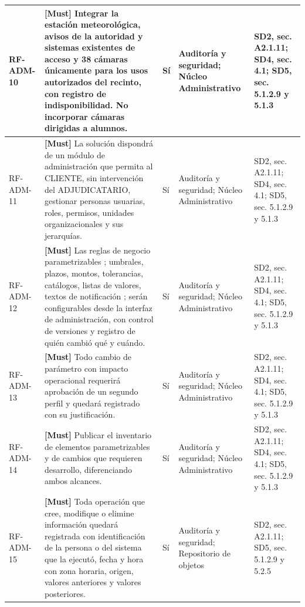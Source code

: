 \begin{paginaHorizontalSynaptix}
\begin{longtable}{|L{0.09\AnchoMatrizTDoce}|L{0.385\AnchoMatrizTDoce}|L{0.065\AnchoMatrizTDoce}|L{0.18\AnchoMatrizTDoce}|L{0.28\AnchoMatrizTDoce}|}
RF-\allowbreak{}ADM-\allowbreak{}10 &
\textbf{[Must]} Integrar la estación meteorológica, avisos de la autoridad y sistemas existentes de acceso y 38 cámaras únicamente para los usos autorizados del recinto, con registro de indisponibilidad. No incorporar cámaras dirigidas a alumnos. &
Sí &
Auditoría y seguridad; Núcleo Administrativo &
SD2, sec. A2.1.11; SD4, sec. 4.1; SD5, sec. 5.1.2.9 y 5.1.3 \\ \hline

RF-\allowbreak{}ADM-\allowbreak{}11 &
\textbf{[Must]} La solución dispondrá de un módulo de administración que permita al CLIENTE, sin intervención del ADJUDICATARIO, gestionar personas usuarias, roles, permisos, unidades organizacionales y sus jerarquías. &
Sí &
Auditoría y seguridad; Núcleo Administrativo &
SD2, sec. A2.1.11; SD4, sec. 4.1; SD5, sec. 5.1.2.9 y 5.1.3 \\ \hline

RF-\allowbreak{}ADM-\allowbreak{}12 &
\textbf{[Must]} Las reglas de negocio parametrizables ; umbrales, plazos, montos, tolerancias, catálogos, listas de valores, textos de notificación ;  serán configurables desde la interfaz de administración, con control de versiones y registro de quién cambió qué y cuándo. &
Sí &
Auditoría y seguridad; Núcleo Administrativo &
SD2, sec. A2.1.11; SD4, sec. 4.1; SD5, sec. 5.1.2.9 y 5.1.3 \\ \hline

RF-\allowbreak{}ADM-\allowbreak{}13 &
\textbf{[Must]} Todo cambio de parámetro con impacto operacional requerirá aprobación de un segundo perfil y quedará registrado con su justificación. &
Sí &
Auditoría y seguridad; Núcleo Administrativo &
SD2, sec. A2.1.11; SD4, sec. 4.1; SD5, sec. 5.1.2.9 y 5.1.3 \\ \hline

RF-\allowbreak{}ADM-\allowbreak{}14 &
\textbf{[Must]} Publicar el inventario de elementos parametrizables y de cambios que requieren desarrollo, diferenciando ambos alcances. &
Sí &
Auditoría y seguridad; Núcleo Administrativo &
SD2, sec. A2.1.11; SD4, sec. 4.1; SD5, sec. 5.1.2.9 y 5.1.3 \\ \hline

RF-\allowbreak{}ADM-\allowbreak{}15 &
\textbf{[Must]} Toda operación que cree, modifique o elimine información quedará registrada con identificación de la persona o del sistema que la ejecutó, fecha y hora con zona horaria, origen, valores anteriores y valores posteriores. &
Sí &
Auditoría y seguridad; Repositorio de objetos &
SD2, sec. A2.1.11; SD5, sec. 5.1.2.9 y 5.2.5 \\ \hline


\end{longtable}
\end{paginaHorizontalSynaptix}

